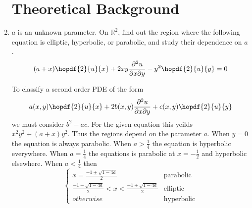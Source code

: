 \documentclass{article}
\newcommand\NoIndent[1]{%
  \begingroup
  \par
  \parshape0
  #1\par
  \endgroup
}
\begin{document}
\begin{enumerate}
\NoIndent{\section{Theoretical Background}}

	\item $a$ is an unknown parameter.
		On $\mathbb{R}^2$, find out the region where the following equation is
		elliptic, hyperbolic, or parabolic, and study their dependence on $a$.
		\begin{equation*}
			(a+x)\hopdf{2}{u}{x} + 2xy\frac{\partial^2 u}{\partial x \partial y}
				- y^2\hopdf{2}{u}{y} = 0
		\end{equation*}

\NoIndent{
	To classify a second order PDE of the form
	\begin{equation*}
		a(x,y)\hopdf{2}{u}{x} + 2b(x,y)\frac{\partial^2 u}{\partial x \partial y} + c(x,y)\hopdf{2}{u}{y}
	\end{equation*}
	we must consider $b^2 - ac$.
	For the given equation this yeilds $x^2 y^2 + (a+x)y^2$.
	Thus the regions depend on the parameter $a$.
	When $y = 0$ the equation is always parabolic.
	When $a > \frac{1}{4}$ the equation is hyperbolic everywhere.
	When $a = \frac{1}{4}$ the equations is parabolic at $x = -\frac{1}{2}$ and hyperbolic elsewhere.
	When $a < \frac{1}{4}$ then
	\begin{equation*}
		\begin{cases}
			x = \displaystyle\frac{-1 \pm \sqrt{1-4a}}{2}  & \mathrm{parabolic} \\
			\displaystyle\frac{-1 - \sqrt{1-4a}}{2} < x < \displaystyle\frac{-1 + \sqrt{1-4a}}{2}
				& \mathrm{elliptic} \\
			otherwise & \mathrm{hyperbolic}
		\end{cases}
	\end{equation*}
}


\end{enumerate}
\end{document}
